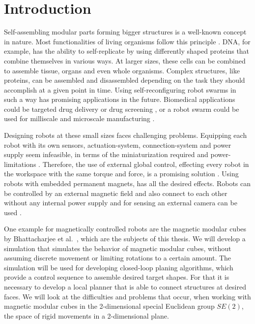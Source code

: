 \chapter{Introduction}
\label{chap:intro}

Self-assembling modular parts forming bigger structures is a well-known concept in nature.
Most functionalities of living organisms follow this principle \cite{bishop2005}.
DNA, for example, has the ability to self-replicate by using differently shaped proteins that combine themselves in various ways.
At larger sizes, these cells can be combined to assemble tissue, organs and even whole organisms.
Complex structures, like proteins, can be assembled and disassembled depending on the task they should accomplish at a given point in time. 
Using self-reconfiguring robot swarms in such a way has promising applications in the future.
Biomedical applications could be targeted drug delivery or drug screening \cite{sitti2015}, or a robot swarm could be used for milliscale and microscale manufacturing \cite{pelrine2016}.

Designing robots at these small sizes faces challenging problems.
Equipping each robot with its own sensors, actuation-system, connection-system and power supply seem infeasible, in terms of the miniaturization required and power-limitations \cite{white2007}.
Therefore, the use of external global control, effecting every robot in the workspace with the same torque and force, is a promising solution \cite{white2007}.
Using robots with embedded permanent magnets, has all the desired effects.
Robots can be controlled by an external magnetic field and also connect to each other without any internal power supply and for sensing an external camera can be used \cite{saab2019}.

One example for magnetically controlled robots are the magnetic modular cubes by Bhattacharjee et al.\ \cite{Bhattacharjee2022}, which are the subjects of this thesis.
We will develop a simulation that simulates the behavior of magnetic modular cubes, without assuming discrete movement or limiting rotations to a certain amount.
The simulation will be used for developing closed-loop planing algorithms, which provide a control sequence to assemble desired target shapes.
For that it is necessary to develop a local planner that is able to connect structures at desired faces.
We will look at the difficulties and problems that occur, when working with magnetic modular cubes in the 2-dimensional special Euclidean group \(SE(2)\), the space of rigid movements in a 2-dimensional plane.

